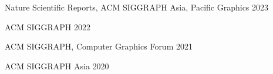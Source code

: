
\begin{cvhonors}
    \cvhonor
	{Nature Scientific Reports, ACM SIGGRAPH Asia, Pacific Graphics}
	{}
	{}
	{2023}

    \cvhonor
	{ACM SIGGRAPH}
	{}
	{}
	{2022}
	
    \cvhonor
	{ACM SIGGRAPH, Computer Graphics Forum}
	{}
	{}
	{2021}
	
	\cvhonor
	{ACM SIGGRAPH Asia}
	{}
	{}
	{2020}

	
\end{cvhonors}